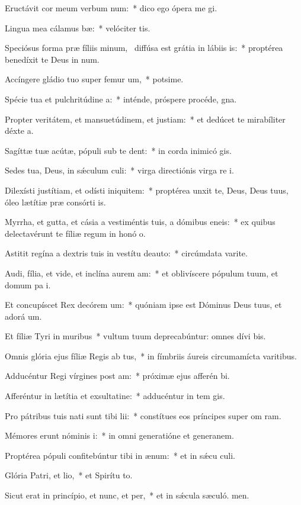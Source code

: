 \item Eructávit cor meum verbum num:~* dico ego ópera me gi.
\item Lingua mea cálamus bæ:~* velóciter tis.
\item Speciósus forma præ fíliis minum,~\pscross{} diffúsa est grátia in lábiis is:~* proptérea benedíxit te Deus in num.
\item Accíngere gládio tuo super femur um,~* potsime.
\item Spécie tua et pulchritúdine a:~* inténde, próspere procéde,  gna.
\item Propter veritátem, et mansuetúdinem, et justiam:~* et dedúcet te mirabíliter déxte a.
\item Sagíttæ tuæ acútæ, pópuli sub te dent:~* in corda inimicó gis.
\item Sedes tua, Deus, in sǽculum culi:~* virga directiónis virga re i.
\item Dilexísti justítiam, et odísti iniquitem:~* proptérea unxit te, Deus, Deus tuus, óleo lætítiæ præ consórti is.
\item Myrrha, et gutta, et cásia a vestiméntis tuis, a dómibus eneis:~* ex quibus delectavérunt te fíliæ regum in honó o.
\item Astitit regína a dextris tuis in vestítu deauto:~* circúmdata varite.
\item Audi, fília, et vide, et inclína aurem am:~* et oblivíscere pópulum tuum, et domum pa i.
\item Et concupíscet Rex decórem um:~* quóniam ipse est Dóminus Deus tuus, et adorá um.
\item Et fíliæ Tyri in muribus~* vultum tuum deprecabúntur: omnes dívi bis.
\item Omnis glória ejus fíliæ Regis ab tus,~* in fímbriis áureis circumamícta varitibus.
\item Adducéntur Regi vírgines post am:~* próximæ ejus afferén bi.
\item Afferéntur in lætítia et exsultatine:~* adducéntur in tem gis.
\item Pro pátribus tuis nati sunt tibi lii:~* constítues eos príncipes super om ram.
\item Mémores erunt nóminis i:~* in omni generatióne et generanem.
\item Proptérea pópuli confitebúntur tibi in ænum:~* et in sǽcu culi.
\item Glória Patri, et lio,~* et Spirítu to.
\item Sicut erat in princípio, et nunc, et per,~* et in sǽcula sæculó. men.
